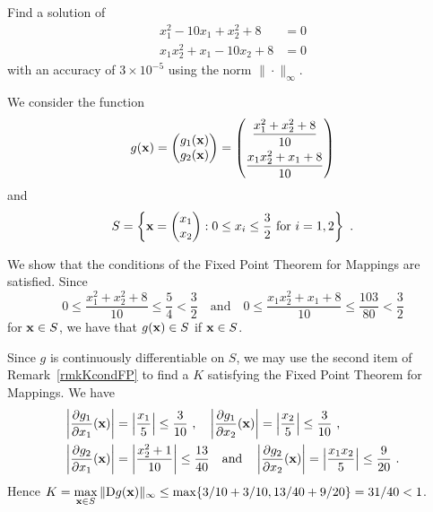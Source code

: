 \begin{egg}
Find a solution of
\begin{align*}
x_1^2 - 10x_1 +x_2^2 + 8 &= 0\\
x_1x_2^2 + x_1 -10x_2+8 &= 0
\end{align*}
with an accuracy of $3 \times 10^{-5}$ using the norm
$\|\cdot\|_\infty$.

We consider the function
\[
g(\mathbf{x}) = \begin{pmatrix}
g_1(\mathbf{x}) \\ g_2(\mathbf{x})
\end{pmatrix} = \begin{pmatrix}
\displaystyle \frac{x_1^2 + x_2^2 +8}{10} \\[0.7em]
\displaystyle \frac{x_1x_2^2 +x_1 +8}{10}
\end{pmatrix}
\]
and
\[
S = \left\{ \mathbf{x} = \begin{pmatrix}
x_1 \\ x_2
\end{pmatrix} : 0 \leq x_i \leq \frac{3}{2} \text{ for } i=1,2 \right\} \ .
\]

We show that the conditions of the Fixed Point Theorem for Mappings are
satisfied.  Since
\[
0 \leq \frac{x_1^2 + x_2^2 + 8}{10} \leq \frac{5}{4} < \frac{3}{2}
\quad \text{and} \quad
0 \leq \frac{x_1x_2^2 + x_1 +8}{10} \leq \frac{103}{80} < \frac{3}{2}
\]
for $\mathbf{x} \in S$, we have that $g(\mathbf{x}) \in S$ if
$\mathbf{x} \in S$.

Since $g$ is continuously differentiable on $S$, we may use the
second item of Remark~\ref{rmkKcondFP} to find a $K$ satisfying the
Fixed Point Theorem for Mappings.  We have
\begin{align*}
\left| \frac{\partial{g_1}}{\partial{x_1}}(\mathbf{x}) \right| &=
\left| \frac{x_1}{5} \right| \leq \frac{3}{10} \ , \quad
\left| \frac{\partial{g_1}}{\partial{x_2}}(\mathbf{x}) \right| =
\left| \frac{x_2}{5}\right| \leq \frac{3}{10} \ , \\
\left| \frac{\partial{g_2}}{\partial{x_1}}(\mathbf{x}) \right| &=
\left| \frac{x_2^2+1}{10}\right| \leq \frac{13}{40} \quad \text{and}
\quad
\left| \frac{\partial{g_2}}{\partial{x_2}}(\mathbf{x}) \right| =
\left| \frac{x_1 x_2}{5}\right| \leq \frac{9}{20} \ .
\end{align*}
Hence $\displaystyle K = \max_{\mathbf{x} \in S} \|\mathrm{D} g(\mathbf{x})\|_\infty \leq
\max\{3/10 + 3/10,13/40 + 9/20\} = 31/40 <1$.


\end{egg}
